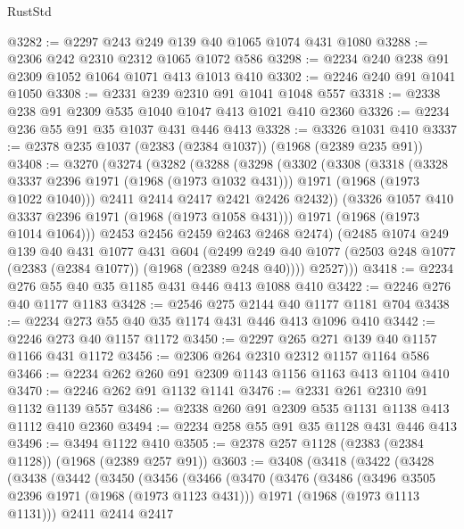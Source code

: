 \begin{lexlean}{RustStd}
\begin{coremodule}
@3282 := @2297 @243 @249 @139 @40 @1065 @1074 @431 @1080
@3288 := @2306 @242 @2310 @2312 @1065 @1072 @586
@3298 := @2234 @240 @238 @91 @2309 @1052 @1064 @1071 @413 @1013 @410
@3302 := @2246 @240 @91 @1041 @1050
@3308 := @2331 @239 @2310 @91 @1041 @1048 @557
@3318 := @2338 @238 @91 @2309 @535 @1040 @1047 @413 @1021 @410 @2360
@3326 := @2234 @236 @55 @91 @35 @1037 @431 @446 @413
@3328 := @3326 @1031 @410
@3337 := @2378 @235 @1037 (@2383 (@2384 @1037)) (@1968 (@2389 @235 @91))
@3408 := @3270
    (@3274
      (@3282
        (@3288
          (@3298
            (@3302
              (@3308
                (@3318
                  (@3328 @3337 @2396 @1971 (@1968 (@1973 @1032 @431)))
                  @1971
                  (@1968 (@1973 @1022 @1040)))
                @2411
                @2414
                @2417
                @2421
                @2426
                @2432))
            (@3326 @1057 @410 @3337 @2396 @1971 (@1968 (@1973 @1058 @431)))
            @1971
            (@1968 (@1973 @1014 @1064)))
          @2453
          @2456
          @2459
          @2463
          @2468
          @2474)
        (@2485
          @1074
          @249
          @139
          @40
          @431
          @1077
          @431
          @604
          (@2499 @249 @40 @1077 (@2503 @248 @1077 (@2383 (@2384 @1077)) (@1968 (@2389 @248 @40))))
          @2527)))
@3418 := @2234 @276 @55 @40 @35 @1185 @431 @446 @413 @1088 @410
@3422 := @2246 @276 @40 @1177 @1183
@3428 := @2546 @275 @2144 @40 @1177 @1181 @704
@3438 := @2234 @273 @55 @40 @35 @1174 @431 @446 @413 @1096 @410
@3442 := @2246 @273 @40 @1157 @1172
@3450 := @2297 @265 @271 @139 @40 @1157 @1166 @431 @1172
@3456 := @2306 @264 @2310 @2312 @1157 @1164 @586
@3466 := @2234 @262 @260 @91 @2309 @1143 @1156 @1163 @413 @1104 @410
@3470 := @2246 @262 @91 @1132 @1141
@3476 := @2331 @261 @2310 @91 @1132 @1139 @557
@3486 := @2338 @260 @91 @2309 @535 @1131 @1138 @413 @1112 @410 @2360
@3494 := @2234 @258 @55 @91 @35 @1128 @431 @446 @413
@3496 := @3494 @1122 @410
@3505 := @2378 @257 @1128 (@2383 (@2384 @1128)) (@1968 (@2389 @257 @91))
@3603 := @3408
    (@3418
      (@3422
        (@3428
          (@3438
            (@3442
              (@3450
                (@3456
                  (@3466
                    (@3470
                      (@3476
                        (@3486
                          (@3496 @3505 @2396 @1971 (@1968 (@1973 @1123 @431)))
                          @1971
                          (@1968 (@1973 @1113 @1131)))
                        @2411
                        @2414
                        @2417

\end{coremodule}
\end{lexlean}

